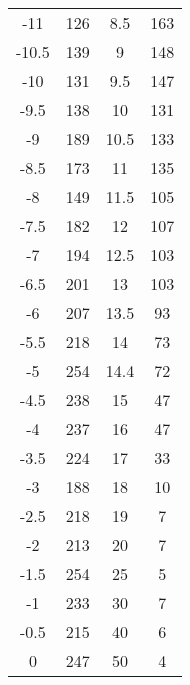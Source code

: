 \begin{table}
\begin{tabular}{c c || c c}
            -11    &      126   &   8.5     &     163   \\   
            -10.5  &      139   &   9       &     148   \\      
            -10    &      131   &   9.5     &     147   \\   
            -9.5   &      138   &   10      &     131   \\      
            -9     &      189   &   10.5    &     133   \\      
            -8.5   &      173   &   11      &     135   \\      
            -8     &      149   &   11.5    &     105   \\      
            -7.5   &      182   &   12      &     107   \\      
            -7     &      194   &   12.5    &     103   \\      
            -6.5   &      201   &   13      &     103   \\      
            -6     &      207   &   13.5    &     93    \\     
            -5.5   &      218   &   14      &     73    \\     
            -5     &      254   &   14.4    &     72    \\     
            -4.5   &      238   &   15      &     47    \\     
            -4     &      237   &   16      &     47    \\     
            -3.5   &      224   &   17      &     33    \\     
            -3     &      188   &   18      &     10    \\     
            -2.5   &      218   &   19      &     7     \\    
            -2     &      213   &   20      &     7     \\    
            -1.5   &      254   &   25      &     5     \\    
            -1     &      233   &   30      &     7     \\    
            -0.5   &      215   &   40      &     6     \\    
            0      &      247   &   50      &     4     \\      
    \end{tabular}
\end{table}
 
